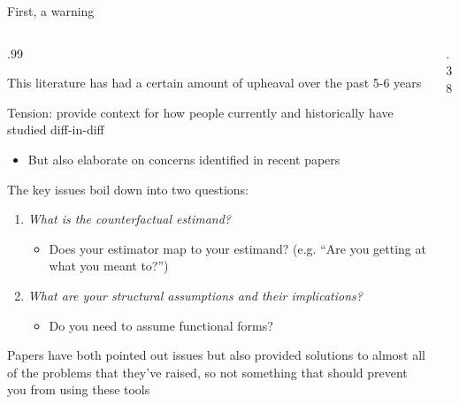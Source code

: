 \documentclass[notes,11pt, aspectratio=169]{beamer}
\newenvironment{wideitemize}{\itemize\addtolength{\itemsep}{10pt}}{\enditemize}
\begin{document}
\begin{frame}{First, a warning}
	\begin{columns}[T] %
		\begin{column}{.99\textwidth}
			\begin{wideitemize}
				\item This literature has had a certain amount of upheaval over the
				past 5-6 years
				\item Tension: provide context for how people currently and
				historically have studied diff-in-diff
				\begin{itemize}
					\item But also elaborate on concerns identified in recent papers
				\end{itemize}
				\item The key issues boil down into two questions:
				\begin{enumerate}
					\item \emph{What is the counterfactual estimand?}
					      \begin{itemize}
						      \item Does your estimator map to your estimand? (e.g. ``Are you getting at what you meant to?'')
					      \end{itemize}
					\item \emph{What are your structural assumptions and their implications?}
					      \begin{itemize}
						      \item Do you need to assume functional forms?
					      \end{itemize}
				\end{enumerate}
				\item Papers have both pointed out issues but also provided
				solutions to almost all of the problems that they've raised,
				so not something that should prevent you from using these
				tools
			\end{wideitemize}
		\end{column}%
		\hfill%
		\begin{column}{.38\textwidth}

		\end{column}%
	\end{columns}
\end{frame}
\end{document}
